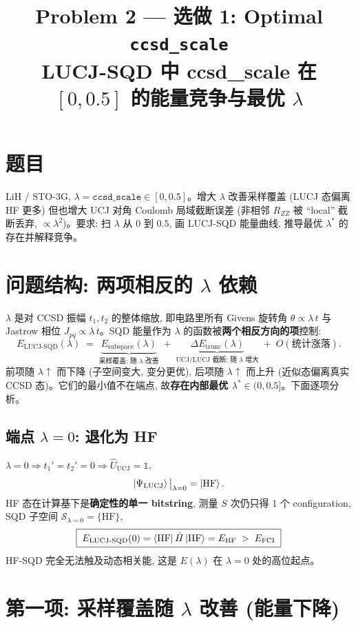 \documentclass[11pt]{article}
\title{\textbf{Problem 2 --- 选做 1: Optimal \texttt{ccsd\_scale}}\\
LUCJ-SQD 中 ccsd\_scale 在 $[0,0.5]$ 的能量竞争与最优 $\lambda$}
\date{}
\begin{document}
\maketitle

\section*{题目}
LiH / STO-3G, $\lambda=\texttt{ccsd\_scale}\in[0,0.5]$。增大 $\lambda$ 改善采样覆盖
(LUCJ 态偏离 HF 更多) 但也增大 UCJ 对角 Coulomb 局域截断误差 (非相邻 $R_{ZZ}$ 被
``local'' 截断丢弃, $\propto\lambda^2$)。要求: 扫 $\lambda$ 从 $0$ 到 $0.5$, 画
LUCJ-SQD 能量曲线, 推导最优 $\lambda^\ast$ 的存在并解释竞争。

\section{\texorpdfstring{问题结构: 两项相反的 $\lambda$ 依赖}{问题结构: 两项相反的 lambda 依赖}}
$\lambda$ 是对 CCSD 振幅 $t_1,t_2$ 的整体缩放, 即电路里所有 Givens 旋转角
$\theta\propto\lambda\,t$ 与 Jastrow 相位 $J_{pq}\propto\lambda\,t$。SQD 能量作为
$\lambda$ 的函数被\textbf{两个相反方向的项}控制:
\[
  E_{\text{LUCJ-SQD}}(\lambda)
  \;=\;\underbrace{E_{\text{subspace}}(\lambda)}_{\text{采样覆盖: 随 $\lambda$ 改善}}
  \;+\;\underbrace{\Delta E_{\text{trunc}}(\lambda)}_{\text{UCJ/LUCJ 截断: 随 $\lambda$ 增大}}
  \;+\;O(\text{统计涨落}) .
\]
前项随 $\lambda\!\uparrow$ 而下降 (子空间变大, 变分更优), 后项随 $\lambda\!\uparrow$
而上升 (近似态偏离真实 CCSD 态)。它们的最小值不在端点, 故\textbf{存在内部最优
$\lambda^\ast\in(0,0.5]$}。下面逐项分析。

\subsection*{端点 $\lambda=0$: 退化为 HF}
$\lambda=0 \Rightarrow t_1'=t_2'=0 \Rightarrow \hat U_{\text{UCJ}}=\mathbb{1}$,
\[
  \ket{\Psi_{\text{LUCJ}}}\big|_{\lambda=0}=\ket{\text{HF}} .
\]
HF 态在计算基下是\textbf{确定性的单一 bitstring}, 测量 $S$ 次仍只得 1 个
configuration, SQD 子空间 $\mathcal{S}_{\lambda=0}=\{\text{HF}\}$,
\[
  \boxed{\;E_{\text{LUCJ-SQD}}(0)=\bra{\text{HF}}\hat H\ket{\text{HF}}=E_{\text{HF}}
  \;>\;E_{\text{FCI}}\;}
\]
HF-SQD 完全无法触及动态相关能, 这是 $E(\lambda)$ 在 $\lambda=0$ 处的高位起点。

\section{\texorpdfstring{第一项: 采样覆盖随 $\lambda$ 改善 (能量下降)}{第一项: 采样覆盖随 lambda 改善 (能量下降)}}
\end{document}

